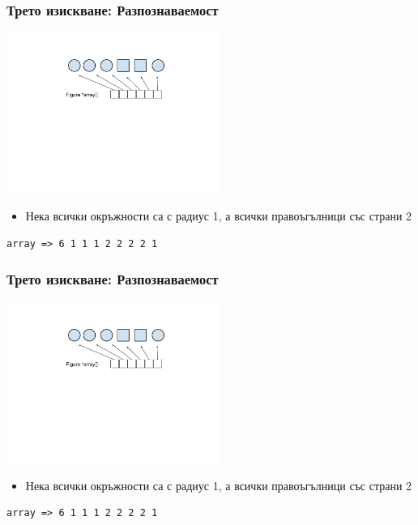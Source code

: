 \documentclass{beamer}
\begin{document}
\begin{frame}[fragile]
\frametitle{Трето изискване: Разпознаваемост}

\vspace{-60px}
\begin{center}
\includegraphics[width=7.0cm]{images/array}
\end{center}

\vspace{-80px}

\begin{itemize}
  \item Нека всички окръжности са с радиус 1, а всички правоъгълници със страни 2
\end{itemize}

\begin{lstlisting}
array => 6 1 1 1 2 2 2 2 1
\end{lstlisting}

\end{frame}

\begin{frame}[fragile]
\frametitle{Трето изискване: Разпознаваемост}

\vspace{-60px}
\begin{center}
\includegraphics[width=7.0cm]{images/array}
\end{center}

\vspace{-80px}

\begin{itemize}
  \item Нека всички окръжности са с радиус 1, а всички правоъгълници със страни 2
\end{itemize}

\begin{lstlisting}
array => 6 1 1 1 2 2 2 2 1
\end{lstlisting}

\end{frame}
\end{document}

